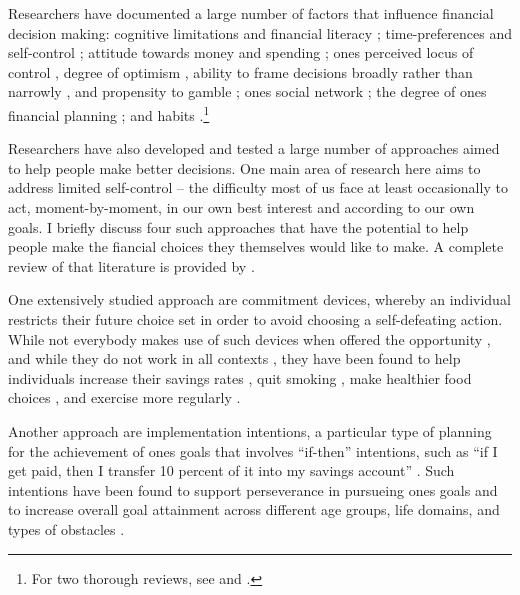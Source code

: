 Researchers have documented a large number of factors that influence financial
decision making: cognitive limitations and financial literacy
\citep{agarwal2009age, agarwal2013cognitive, korniotis2011older,
    agarwal2010learning, fernandes2014financial, jorring2020financial};
    time-preferences and self-control \citep{frederick2002time,
    read2018intertemporal, ericson2019intertemporal, cohen2020measuring};
    attitude towards money and spending \citep{rick2008tightwads,
    rick2011fatal}; ones perceived locus of control \citep{perry2005control},
    degree of optimism \citep{puri2007optimism}, ability to frame decisions
    broadly rather than narrowly \citep{kumar2008decision}, and propensity to
    gamble \citep{kumar2009gambles}; ones social network
    \citep{bailey2018economic, kuchler2021social}; the degree of ones financial
    planning \citep{ameriks2003wealth}; and habits
    \citep{blumenstock2018defaults, schaner2018persistent,
        de2013deposit}.\footnote{For two thorough reviews, see
    \citet{agarwal2017shapes} and \citet{greenberg2019financial}.}

Researchers have also developed and tested a large number of approaches aimed
to help people make better decisions. One main area of research here aims to
address limited self-control -- the difficulty most of us face at least
occasionally to act, moment-by-moment, in our own best interest and according
to our own goals. I briefly discuss four such approaches that have the
potential to help people make the fiancial choices they themselves would like
to make. A complete review of that literature is provided by
\citet{duckworth2018beyond}.

One extensively studied approach are commitment devices, whereby an individual
restricts their future choice set in order to avoid choosing a self-defeating
action. While not everybody makes use of such devices when offered the
opportunity \citep{bryan2010commitment}, and while they do not work in all
contexts \citep{laibson2015don,robinson2018some}, they have been found to help
individuals increase their savings rates \citep{ashraf2006tying}, quit smoking
\citep{gine2010put}, make healthier food choices \citep{schwartz2014healthier},
and exercise more regularly \citep{royer2015incentives}.

Another approach are implementation intentions, a particular type of planning
for the achievement of ones goals that involves ``if-then'' intentions, such as
``if I get paid, then I transfer 10 percent of it into my savings account''
\citep{gollwitzer2006implementation, rogers2015beyond}. Such intentions have
been found to support perseverance in pursueing ones goals
\citep{oettingen2010strategies} and to increase overall goal attainment across
different age groups, life domains, and types of obstacles
\citep{gollwitzer2006implementation}.

